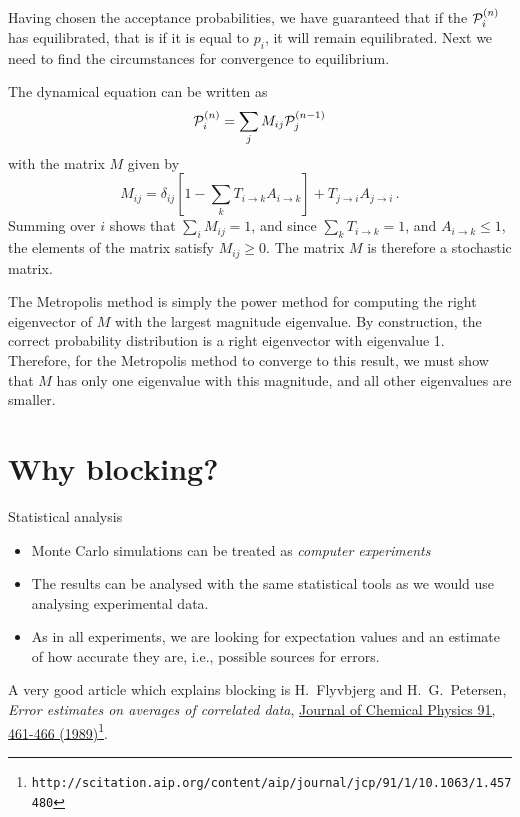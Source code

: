 \documentclass[graybox,sectrefs,envcountresetchap,open=right]{svmonodo}
\begin{document}
Having chosen the acceptance probabilities, we have guaranteed that
if the  ${\cal P}_i^{(n)}$ has equilibrated, that is if it is equal to $p_i$,
it will remain equilibrated. Next we need to find the circumstances for
convergence to equilibrium.

The dynamical equation can be written as
\[
{\cal P}^{(n)}_i = \sum_j M_{ij}{\cal P}^{(n-1)}_j
\]
with the matrix $M$ given by
\[
M_{ij} = \delta_{ij}\left [ 1 -\sum_k T_{i\rightarrow k} A_{i \rightarrow k}
\right ] + T_{j\rightarrow i} A_{j\rightarrow i} \,.
\]
Summing over $i$ shows that $\sum_i M_{ij} = 1$, and since
$\sum_k T_{i\rightarrow k} = 1$, and $A_{i \rightarrow k} \leq 1$, the
elements of the matrix satisfy $M_{ij} \geq 0$. The matrix $M$ is therefore
a stochastic matrix.




The Metropolis method is simply the power method for computing the
right eigenvector of $M$ with the largest magnitude eigenvalue.
By construction, the correct probability distribution is a right eigenvector
with eigenvalue 1. Therefore, for the Metropolis method to converge
to this result, we must show that $M$ has only one eigenvalue with this
magnitude, and all other eigenvalues are smaller.





\section{Why blocking?}
 Statistical analysis
\begin{itemize}
    \item Monte Carlo simulations can be treated as \emph{computer experiments}

    \item The results can be analysed with the same statistical tools as we would use analysing experimental data.

    \item As in all experiments, we are looking for expectation values and an estimate of how accurate they are, i.e., possible sources for errors.
\end{itemize}

\noindent
A very good article which explains blocking is H.~Flyvbjerg and H.~G.~Petersen, \emph{Error estimates on averages of correlated data},  \href{{http://scitation.aip.org/content/aip/journal/jcp/91/1/10.1063/1.457480}}{Journal of Chemical Physics 91, 461-466 (1989)}\footnote{\texttt{http://scitation.aip.org/content/aip/journal/jcp/91/1/10.1063/1.457480}}.
\end{document}
